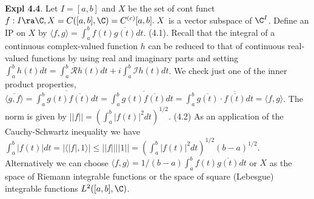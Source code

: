 {\bf Expl 4.4}. Let $I=[a,b]$ and $X$ be the set of cont funct $f:I\ra \C, X = C([a,b],\C)=C^{(c)}[a,b]. \; X$ is a vector subspace of $\C^I$. Define an IP on $X$ by $\langle f,g \rangle = \int_a^bf(t)\overline{g(t)}dt$. (4.1). Recall that the integral of a continuous complex-valued function $h$ can be reduced to that of continuous real-valued functions by using real and imaginary parts and setting $\int_a^b h(t)dt=\int_a^b \mathcal{R}h(t)dt+i\int_a^b \mathcal{I}h(t)dt$. We check just one of the inner product properties, $\overline{\langle g,f \rangle}=\overline{\int_a^b g(t)\overline{f(t)}dt}=\int_a^b \overline{g(t)\overline{f(t)}}dt=\int_a^b \overline{g(t)}\cdot \overline{\overline{f(t)}}dt=\langle f,g\rangle$. The norm is given by $||f||=(\int_a^b|f(t)|^2dt)^{1/2}$. (4.2) As an application of the Cauchy-Schwartz inequality we have $\int_a^b |f(t)|dt=|\langle|f|,1\rangle|\leq ||f||||1||=(\int_a^b|f(t)|^2dt)^{1/2}(b-a)^{1/2}$. Alternatively we can choose $\langle f,g\rangle = 1/(b-a)\int_a^b f(t)\overline{g(t)}dt$ or $X$ as the space of Riemann integrable functions or the space of square (Lebesgue) integrable functions $L^2([a,b],\C)$. 